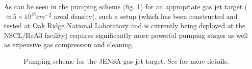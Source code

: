 As can be seen in the pumping scheme (fig. \ref{fig:jensa}) for an appropriate gas jet target ($\approx 5\times10^{18} \unit{cm^{-2}}$ areal density), such a setup (which has been constructed and tested at Oak Ridge National Laboratory and is currently being deployed at the NSCL/ReA3 facility) requires significantly more powerful pumping stages as well as expensive gas compression and cleaning.\\
 
\begin{figure}
\caption{Pumping scheme for the JENSA gas jet target. See \cite{chi13} for more details.}
\label{fig:jensa}
\end{figure}




